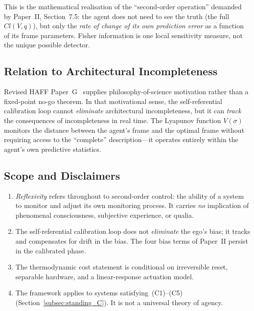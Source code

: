 \documentclass[12pt]{article}
\begin{document}
This is the mathematical realisation of the
``second-order operation'' demanded by
Paper~II, Section~7.5: the agent does not need to see the
truth (the full $Cl(V,q)$), but only the \emph{rate of
change of its own prediction error} as a function of its
frame parameters.
Fisher information is one local sensitivity measure, not the unique
possible detector.

\subsection{Relation to Architectural Incompleteness}
\label{subsec:haff_g}

Revised HAFF Paper~G~\cite{Liu2026HAFF_G} supplies
philosophy-of-science motivation rather than a fixed-point no-go
theorem.  In that motivational sense,
the self-referential calibration loop cannot \emph{eliminate}
architectural incompleteness, but it can \emph{track}
the consequences of incompleteness in real time.
The Lyapunov function $V(\sigma)$ monitors the distance
between the agent's frame and the optimal frame without
requiring access to the ``complete'' description---it
operates entirely within the agent's own predictive
statistics.

\subsection{Scope and Disclaimers}
\label{subsec:scope}

\begin{enumerate}
\item \emph{Reflexivity} refers throughout to
  second-order control: the ability of a system to
  monitor and adjust its own monitoring process.
  It carries \emph{no} implication of phenomenal
  consciousness, subjective experience, or qualia.
\item The self-referential calibration loop does not
  \emph{eliminate} the ego's bias; it tracks and
  compensates for drift in the bias.
  The four bias terms of Paper~II persist in the
  calibrated phase.
\item The thermodynamic cost statement is conditional on irreversible
  reset, separable hardware, and a linear-response actuation model.
\item The framework applies to systems
  satisfying~(C1)--(C5) (Section~\ref{subsec:standing_C}).
  It is not a universal theory of agency.
\end{enumerate}
\end{document}

